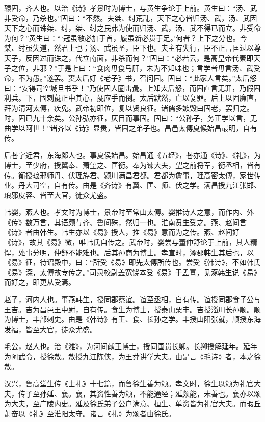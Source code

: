 \documentclass[12pt,UTF8]{ctexbook}
\begin{document}
辕固，齐人也。以治《诗》孝景时为博士，与黄生争论于上前。黄生曰：“汤、武非受命，乃杀也。”固曰：“不然。夫桀、纣荒乱，天下之心皆归汤、武，汤、武因天下之心而诛桀、纣，桀、纣之民弗为使而归汤、武，汤、武不得已而立。非受命为何？”黄生曰：“‘冠虽敝必加于首，履虽新必贯于足。’何者？上下之分也。今桀、纣虽失道，然君上也；汤、武虽圣，臣下也。夫主有失行，臣不正言匡过以尊天子，反因过而诛之，代立南面，非杀而何？”固曰：“必若云，是高皇帝代秦即天子之位，非邪？”于是上曰：“食肉毋食马肝，未为不知味也；言学者毋言汤、武受命，不为愚。”遂罢。窦太后好《老子》书，召问固。固曰：“此家人言矣。”太后怒曰：“安得司空城旦书乎！”乃使固人圈击彘。上知太后怒，而固直言无罪，乃假固利兵。下，固刺彘正中其心，彘应手而倒。太后默然，亡以复罪。后上以固廉直，拜为清河太傅，疾免。武帝初即位，复以贤良征。诸儒多嫉毁曰固老，罢归之。时，固已九十余矣。公孙弘亦征，仄目而事固。固曰：“公孙子，务正学以言，无曲学以阿世！”诸齐以《诗》显贵，皆固之弟子也。昌邑太傅夏候始昌最明，自有传。



后苍字近君，东海郯人也。事夏侯始昌。始昌通《五经》，苍亦通《诗》、《礼》，为博士，至少府，授翼奉、萧望之、匡衡。奉为谏大夫，望之前将军，衡丞相，皆有传。衡授琅邪师丹、伏理斿君、颍川满昌君都。君都为詹事，理高密太傅，家世传业。丹大司空，自有传。由是《齐诗》有翼、匡、师、伏之学。满昌授九江张邯、琅邪皮容、皆至大官，徒众尤盛。



韩婴，燕人也。孝文时为博士，景帝时至常山太傅。婴推诗人之意，而作内、外《传》数万言，其语颇与齐、鲁间殊，然归一也。淮南贲生受之。燕、赵间言《诗》者由韩生。韩生亦以《易》授人，推《易》意而为之传。燕、赵间好《诗》，故其《易》微，唯韩氏自传之。武帝时，婴尝与董仲舒论于上前，其人精悍，处事分明，仲舒不能难也。后其孙商为博士。孝宣时，涿郡韩生其后也，以《易》征，待诏殿中，曰：“所受《易》即先太傅所传也。尝受《韩诗》，不如韩氏《易》深，太傅故专传之。”司隶校尉盖宽饶本受《易》于孟喜，见涿韩生说《易》而好之，即更从受焉。



赵子，河内人也。事燕韩生，授同郡蔡谊。谊至丞相，自有传。谊授同郡食子公与王吉。吉为昌邑王中尉，自有传。食生为博士，授泰山栗丰。吉授淄川长孙顺。顺为博士，丰部刺史。由是《韩诗》有王、食、长孙之学。丰授山阳张就，顺授东海发福，皆至大官，徒众尤盛。



毛公，赵人也。治《潍》，为河间献王博士，授同国贯长卿。长卿授解延年。延年为阿武令，授徐敖。敖授九江陈侠，为王莽讲学大夫。由是言《毛诗》者，本之徐敖。



汉兴，鲁高堂生传《士礼》十七篇，而鲁徐生善为颂。孝文时，徐生以颂为礼官大夫，传子至孙延、襄。襄，其资性善为颂，不能通经；延颇能，未善也。襄亦以颂为大夫，至广陵内史。延及徐氏弟子公户满意、桓生、单资皆为礼官大夫。而瑕丘萧奋以《礼》至淮阳太守。诸言《礼》为颂者由徐氏。
\end{document}
